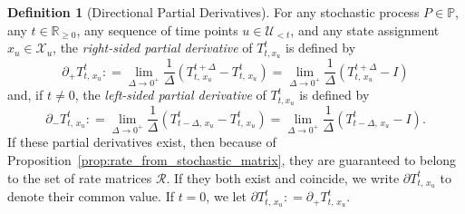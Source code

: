 \documentclass[10pt,a4paper]{paper}
\theoremstyle{definition}
\newtheorem{definition}{Definition}
\newcommand{\reals}{\mathbb{R}}
\newcommand{\realsnonneg}{\reals_{\geq 0}}
\newcommand{\states}{\mathcal{X}}
\newcommand{\processes}{\mathbb{P}}
\newcommand{\coloneqq}{:\!=}
\begin{document}
\begin{definition}[Directional Partial Derivatives]\label{def:direc_partial_deriv}
For any stochastic process $P\in\processes$, any $t\in\realsnonneg$, any sequence of time points $u\in\mathcal{U}_{<t}$, and any state assignment $x_u\in\states_u$, the \emph{right-sided partial derivative} of $T_{t,x_u}^t$ is defined by
\begin{equation*}
\partial_{+}{T_{t,\,x_u}^t}
\coloneqq
\lim_{\Delta\to 0^{+}}
\frac{1}{\Delta}
(T^{t+\Delta}_{t,\,x_u}-T^t_{t,\,x_u})
=
\lim_{\Delta\to 0^{+}}
\frac{1}{\Delta}
(T^{t+\Delta}_{t,\,x_u}-I)
\end{equation*}
and, if $t\neq0$, the \emph{left-sided partial derivative} of $T_{t,x_u}^t$ is defined by
\begin{equation*}
\partial_{-}{T_{t,\,x_u}^t}
\coloneqq
\lim_{\Delta\to 0^{+}}
\frac{1}{\Delta}
(T^{t}_{t-\Delta,\,x_u}-T^t_{t,\,x_u})
=
\lim_{\Delta\to 0^{+}}
\frac{1}{\Delta}
(T^{t}_{t-\Delta,\,x_u}-I).
\end{equation*}
If these partial derivatives exist, then because of Proposition~\ref{prop:rate_from_stochastic_matrix}, they are guaranteed to belong to the set of rate matrices  $\mathcal{R}$. If they both exist and coincide, we write $\partial{T_{t,\,x_u}^t}$ to denote their common value. If $t=0$, we let $\partial{T_{t,\,x_u}^t}\coloneqq\partial_{+}{T_{t,\,x_u}^t}$.
\end{definition}
\end{document}
